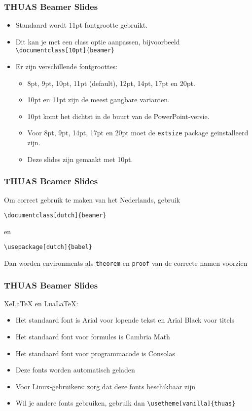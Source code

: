 \documentclass[fleqn,aspectratio=169,dutch,10pt]{beamer}
\begin{document}
\begin{frame}[fragile]
\frametitle{THUAS Beamer Slides}
\begin{itemize}
\item Standaard wordt 11pt fontgrootte gebruikt.
\item Dit kan je met een class optie aanpassen, bijvoorbeeld \lstinline|\documentclass[10pt]{beamer}|
\item Er zijn verschillende fontgroottes: 
\begin{itemize}
\item 8pt, 9pt, 10pt, 11pt (default), 12pt, 14pt, 17pt en 20pt.
\item 10pt en 11pt zijn de meest gangbare varianten.
\item 10pt komt het dichtst in de buurt van de PowerPoint-versie.
\item Voor 8pt, 9pt, 14pt, 17pt en 20pt moet de \lstinline|extsize| package geinstalleerd zijn.
\item Deze slides zijn gemaakt met 10pt.
\end{itemize}
\end{itemize}
\end{frame}


\begin{frame}[fragile]
\frametitle{THUAS Beamer Slides}
Om correct gebruik te maken van het Nederlands, gebruik
\begin{lstlisting}
\documentclass[dutch]{beamer}
\end{lstlisting}
en
\begin{lstlisting}
\usepackage[dutch]{babel}
\end{lstlisting}
Dan worden environments als \lstinline|theorem| en \lstinline|proof| van de correcte namen voorzien

\end{frame}


\begin{frame}[fragile]
\frametitle{THUAS Beamer Slides}
Xe\LaTeX{} en Lua\LaTeX:
\begin{itemize}
\item Het standaard font is Arial voor lopende tekst en Arial Black voor titels
\item Het standaard font voor formules is Cambria Math
\item Het standaard font voor programmacode is Consolas
\item Deze fonts worden automatisch geladen
\item Voor Linux-gebruikers: zorg dat deze fonts beschikbaar zijn
\item Wil je andere fonts gebruiken, gebruik dan \lstinline|\usetheme[vanilla]{thuas}|
\end{itemize}
\end{frame}
\end{document}
